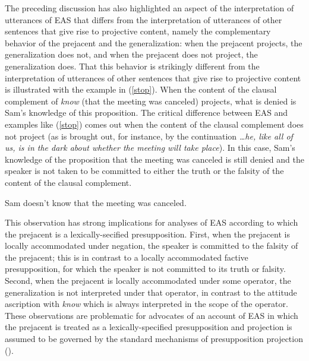 \documentclass[11pt,fleqn]{article}
\newcommand{\6}{\mbox{$[\hspace*{-.6mm}[$}}
\newcommand{\9}{\mbox{$]\hspace*{-.6mm}]$}}
\begin{document}
The preceding discussion has also highlighted an aspect of the interpretation of utterances of EAS that differs from the interpretation of utterances of other sentences that give rise to projective content, namely the complementary behavior of the prejacent and the generalization: when the prejacent projects, the generalization does not, and when the prejacent does not project, the generalization does. That this behavior is strikingly different from the interpretation of utterances of other sentences that give rise to projective content is illustrated with the example in (\ref{stop}). When the content of the clausal complement of {\em know} (that the meeting was canceled) projects, what is denied is Sam's knowledge of this proposition. The critical difference between EAS and examples like (\ref{stop}) comes out when the content of the clausal complement does not project (as is brought out, for instance, by the continuation {\em \ldots he, like all of us, is in the dark about whether the meeting will take place}). In this case, Sam's knowledge of the proposition that the meeting was canceled is still denied and the speaker is not taken to be committed to either the truth or the falsity of the content of the clausal complement. 

\begin{exe}
\ex\label{stop} Sam doesn't know that the meeting was canceled.
\end{exe}
This observation has strong implications for analyses of EAS according to which the prejacent is a lexically-secified presupposition. First, when the prejacent is locally accommodated under negation, the speaker is committed to the falsity of the prejacent; this is in contrast to a locally accommodated factive presupposition, for which the speaker is not committed to its truth or falsity. Second, when the prejacent is locally accommodated under some operator, the generalization is not interpreted under that operator, in contrast to the attitude ascription with {\em know} which is always interpreted in the scope of the operator. These observations are problematic for advocates of an account of EAS in which the prejacent is treated as a lexically-specified presupposition and projection is assumed to be governed by the standard mechanisms of presupposition projection (\citealt{heim83,vds92}).
\end{document}
